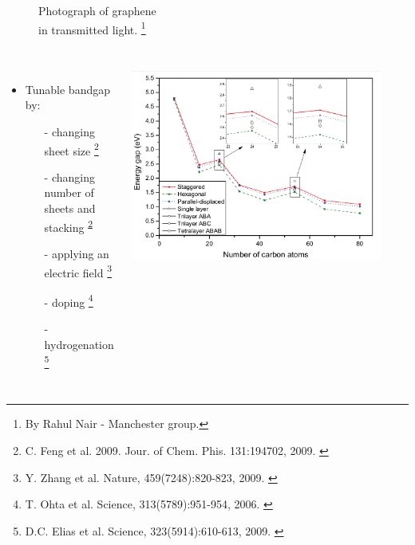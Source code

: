 \documentclass{beamer}
\begin{document}
\begin{frame}
\begin{columns}
\begin{figure}
Photograph of graphene \\
in transmitted light.
\footnote[frame]{\tiny By Rahul Nair - Manchester group.}
\end{figure}
\end{columns}

\hspace{5mm}
\end{frame}


\begin{frame}

\begin{columns}


\begin{itemize}
\item Tunable bandgap by:
\noindent
\begin{itemize}

\item[-] changing sheet size
\footnote[frame]{\tiny C. Feng et al. 2009. Jour. of Chem. Phis. 131:194702,
2009. \label{ft:fengJCP09}}

\item[-] changing number of sheets and stacking\textsuperscript{
\ref{ft:fengJCP09}}

\item[-] applying an electric field
\footnote[frame]{\tiny Y. Zhang et al. Nature, 459(7248):820-823, 2009.
\label{ft:ahangNAT09}}

\item[-] doping
\footnote[frame]{\tiny T. Ohta et al. Science, 313(5789):951-954, 2006.
\label{ft:ohtaSC06}}

\item[-] hydrogenation
\footnote[frame]{\tiny D.C. Elias et al. Science, 323(5914):610-613, 2009.
\label{ft:eliasSC09}}

\end{itemize}
\end{itemize}



\begin{center}
\includegraphics[width=0.9\textwidth]{figs/gap.png}


\end{center}
\end{columns}
\end{frame}
\end{document}
